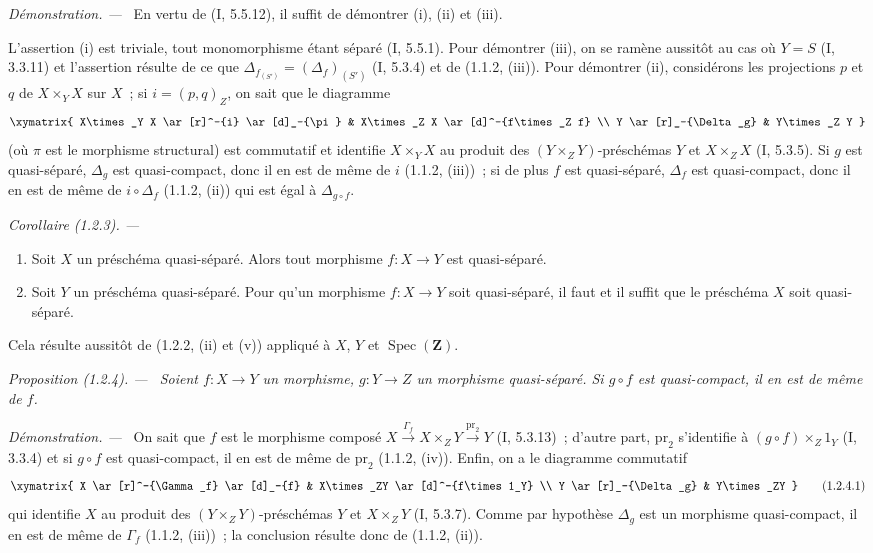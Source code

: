 \documentclass[10pt,oneside]{book}
\makeatletter
\newcommand{\setmanualcurrentlabel}[1]{\def\@currentlabel{#1}}
\newcommand{\oldpage}[2][]{%
  \setcounter{footnote}{0}%
  \marginpar{\scriptsize\textbf{#1}~|~#2}\ignorespaces}
\newenvironment{proposition}[1][]{%
  \setmanualcurrentlabel{#1}\par\medskip\noindent\itshape Proposition (#1). ---\ }{\par}
\newenvironment{corollary}[1][]{%
  \setmanualcurrentlabel{#1}\par\medskip\noindent\itshape Corollaire (#1). ---\ }{\par}
\newenvironment{proof}{%
  \par\medskip\noindent\textit{Démonstration. ---\ }}{\par}
\makeatother
\begin{document}
\begin{proof}
En vertu de (I, 5.5.12), il suffit de démontrer (i), (ii) et (iii).

L'assertion (i) est triviale, tout monomorphisme étant séparé (I, 5.5.1).
Pour démontrer (iii), on se ramène aussitôt au cas où $Y=S$ (I, 3.3.11) et
l'assertion résulte de ce que
$\Delta_{f_{(S')}}=(\Delta_f)_{(S')}$ (I, 5.3.4) et de (1.1.2, (iii)). Pour
démontrer (ii), considérons les projections $p$ et $q$ de $X\times_Y X$ sur
$X$~; si $i=(p,q)_Z$, on sait que le diagramme
\[
\xymatrix{
  X\times_Y X \ar[r]^-{i} \ar[d]_-{\pi} & X\times_Z X
    \ar[d]^-{f\times_Z f} \\
  Y \ar[r]_-{\Delta_g} & Y\times_Z Y
}
\]
\oldpage[IV-1]{227}
(où $\pi$ est le morphisme structural) est commutatif et identifie
$X\times_Y X$ au produit des $(Y\times_Z Y)$-préschémas $Y$ et
$X\times_Z X$ (I, 5.3.5). Si $g$ est quasi-séparé, $\Delta_g$ est
quasi-compact, donc il en est de même de $i$ (1.1.2, (iii))~; si de plus $f$
est quasi-séparé, $\Delta_f$ est quasi-compact, donc il en est de même de
$i\circ\Delta_f$ (1.1.2, (ii)) qui est égal à $\Delta_{g\circ f}$.
\end{proof}

\begin{corollary}[1.2.3]
\label{IV.1.2.3-fr}
\begin{enumerate}
  \item[(i)] Soit $X$ un préschéma quasi-séparé. Alors tout morphisme $f:X\to Y$
  est quasi-séparé.
  \item[(ii)] Soit $Y$ un préschéma quasi-séparé. Pour qu'un morphisme $f:X\to Y$
  soit quasi-séparé, il faut et il suffit que le préschéma $X$ soit
  quasi-séparé.
\end{enumerate}
\end{corollary}

Cela résulte aussitôt de (1.2.2, (ii) et (v)) appliqué à $X$, $Y$ et
$\operatorname{Spec}(\mathbf Z)$.

\begin{proposition}[1.2.4]
\label{IV.1.2.4-fr}
Soient $f:X\to Y$ un morphisme, $g:Y\to Z$ un morphisme quasi-séparé. Si
$g\circ f$ est quasi-compact, il en est de même de $f$.
\end{proposition}

\begin{proof}
On sait que $f$ est le morphisme composé
$X\xrightarrow{\Gamma_f}X\times_ZY\xrightarrow{\mathrm{pr}_2}Y$
(I, 5.3.13)~; d'autre part, $\mathrm{pr}_2$ s'identifie à
$(g\circ f)\times_Z1_Y$ (I, 3.3.4) et si $g\circ f$ est quasi-compact, il en
est de même de $\mathrm{pr}_2$ (1.1.2, (iv)). Enfin, on a le diagramme
commutatif
\[
\xymatrix{
  X \ar[r]^-{\Gamma_f} \ar[d]_-{f} & X\times_ZY
    \ar[d]^-{f\times 1_Y} \\
  Y \ar[r]_-{\Delta_g} & Y\times_ZY
}
\tag{1.2.4.1}
\label{IV.1.2.4.1-fr}
\]
qui identifie $X$ au produit des $(Y\times_ZY)$-préschémas $Y$ et
$X\times_ZY$ (I, 5.3.7). Comme par hypothèse $\Delta_g$ est un morphisme
quasi-compact, il en est de même de $\Gamma_f$ (1.1.2, (iii))~; la conclusion
résulte donc de (1.1.2, (ii)).
\end{proof}
\end{document}
